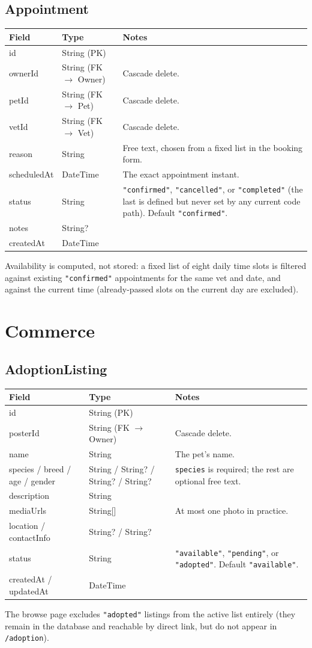 \documentclass[11pt,a4paper]{article}
\makeatletter
\newcommand{\modeltable}[1]{%
  \begin{tabular}{@{}p{3.3cm}p{2.6cm}p{8.3cm}@{}}
  \toprule
  \textbf{Field} & \textbf{Type} & \textbf{Notes} \\
  \midrule
  #1
  \bottomrule
  \end{tabular}
}
\makeatother
\begin{document}
\subsection{Appointment}
\modeltable{
id & String (PK) & \\
ownerId & String (FK $\to$ Owner) & Cascade delete. \\
petId & String (FK $\to$ Pet) & Cascade delete. \\
vetId & String (FK $\to$ Vet) & Cascade delete. \\
reason & String & Free text, chosen from a fixed list in the booking form. \\
scheduledAt & DateTime & The exact appointment instant. \\
status & String & \texttt{"confirmed"}, \texttt{"cancelled"}, or \texttt{"completed"}
  (the last is defined but never set by any current code path). Default
  \texttt{"confirmed"}. \\
notes & String? & \\
createdAt & DateTime & \\
}
Availability is computed, not stored: a fixed list of eight daily time slots is
filtered against existing \texttt{"confirmed"} appointments for the same vet and date,
and against the current time (already-passed slots on the current day are excluded).

\section{Commerce}

\subsection{AdoptionListing}
\modeltable{
id & String (PK) & \\
posterId & String (FK $\to$ Owner) & Cascade delete. \\
name & String & The pet's name. \\
species / breed / age / gender & String / String? / String? / String? & \texttt{species}
  is required; the rest are optional free text. \\
description & String & \\
mediaUrls & String[] & At most one photo in practice. \\
location / contactInfo & String? / String? & \\
status & String & \texttt{"available"}, \texttt{"pending"}, or \texttt{"adopted"}.
  Default \texttt{"available"}. \\
createdAt / updatedAt & DateTime & \\
}
The browse page excludes \texttt{"adopted"} listings from the active list entirely
(they remain in the database and reachable by direct link, but do not appear in
\texttt{/adoption}).
\end{document}
